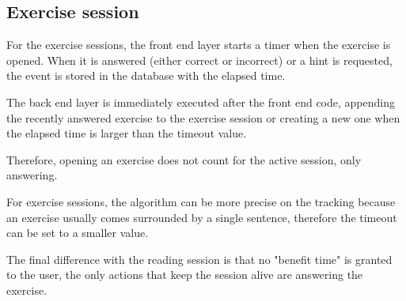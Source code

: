 \subsection{Exercise session}
For the exercise sessions, the front end layer starts a timer when the exercise is opened. When it is answered (either correct or incorrect) or a hint is requested, the event is stored in the database with the elapsed time.

The back end layer is immediately executed after the front end code, appending the recently answered exercise to the exercise session or creating a new one when the elapsed time is larger than the timeout value.

Therefore, opening an exercise does not count for the active session, only answering.

For exercise sessions, the algorithm can be more precise on the tracking because an exercise usually comes surrounded by a single sentence, therefore the timeout can be set to a smaller value. 

The final difference with the reading session is that no "benefit time" is granted to the user, the only actions that keep the session alive are answering the exercise.

